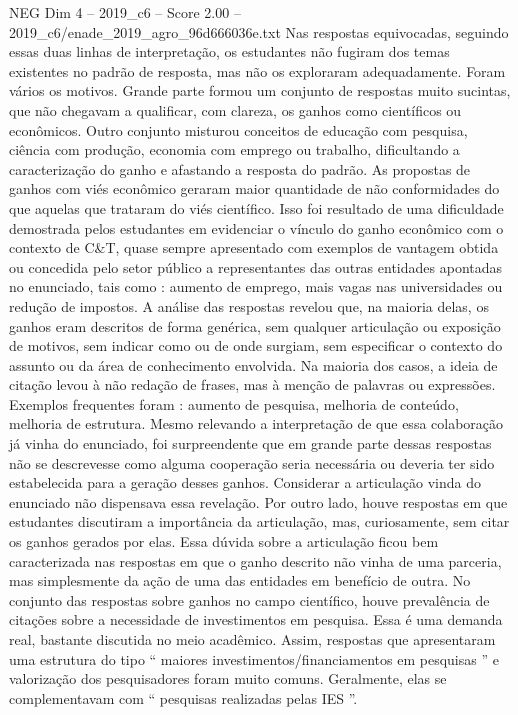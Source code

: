 \begin{textsample}{NEG Dim 4 – 2019\_c6 – Score 2.00 – 2019\_c6/enade\_2019\_agro\_96d666036e.txt}
Nas respostas equivocadas, seguindo essas duas linhas de interpretação, os estudantes não fugiram dos temas existentes no padrão de resposta, mas não os exploraram adequadamente.
Foram vários os motivos.
Grande parte formou um conjunto de respostas muito sucintas, que não chegavam a qualificar, com clareza, os ganhos como científicos ou econômicos.
Outro conjunto misturou conceitos de educação com pesquisa, ciência com produção, economia com emprego ou trabalho, dificultando a caracterização do ganho e afastando a resposta do padrão.
As propostas de ganhos com viés econômico geraram maior quantidade de não conformidades do que aquelas que trataram do viés científico.
Isso foi resultado de uma dificuldade demostrada pelos estudantes em evidenciar o vínculo do ganho econômico com o contexto de C\&T, quase sempre apresentado com exemplos de vantagem obtida ou concedida pelo setor público a representantes das outras entidades apontadas no enunciado, tais como : aumento de emprego, mais vagas nas universidades ou redução de impostos.
A análise das respostas revelou que, na maioria delas, os ganhos eram descritos de forma genérica, sem qualquer articulação ou exposição de motivos, sem indicar como ou de onde surgiam, sem especificar o contexto do assunto ou da área de conhecimento envolvida.
Na maioria dos casos, a ideia de citação levou à não redação de frases, mas à menção de palavras ou expressões.
Exemplos frequentes foram : aumento de pesquisa, melhoria de conteúdo, melhoria de estrutura.
Mesmo relevando a interpretação de que essa colaboração já vinha do enunciado, foi surpreendente que em grande parte dessas respostas não se descrevesse como alguma cooperação seria necessária ou deveria ter sido estabelecida para a geração desses ganhos.
Considerar a articulação vinda do enunciado não dispensava essa revelação.
Por outro lado, houve respostas em que estudantes discutiram a importância da articulação, mas, curiosamente, sem citar os ganhos gerados por elas.
Essa dúvida sobre a articulação ficou bem caracterizada nas respostas em que o ganho descrito não vinha de uma parceria, mas simplesmente da ação de uma das entidades em benefício de outra.
No conjunto das respostas sobre ganhos no campo científico, houve prevalência de citações sobre a necessidade de investimentos em pesquisa.
Essa é uma demanda real, bastante discutida no meio acadêmico.
Assim, respostas que apresentaram uma estrutura do tipo “ maiores investimentos/financiamentos em pesquisas ” e valorização dos pesquisadores foram muito comuns.
Geralmente, elas se complementavam com “ pesquisas realizadas pelas IES ”.

\end{textsample}
